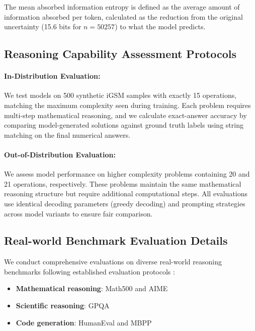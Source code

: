 \documentclass{article} %
\begin{document}
The mean absorbed information entropy is defined as the average amount of information absorbed per token, calculated as the reduction from the original uncertainty (15.6 bits for $n = 50257$) to what the model predicts.

\subsection{Reasoning Capability Assessment Protocols} \label{subsec:reasoning_eval}

\paragraph{In-Distribution Evaluation:}
We test models on 500 synthetic iGSM samples with exactly 15 operations, matching the maximum complexity seen during training. Each problem requires multi-step mathematical reasoning, and we calculate exact-answer accuracy by comparing model-generated solutions against ground truth labels using string matching on the final numerical answers.

\paragraph{Out-of-Distribution Evaluation:}
We assess model performance on higher complexity problems containing 20 and 21 operations, respectively. These problems maintain the same mathematical reasoning structure but require additional computational steps. All evaluations use identical decoding parameters (greedy decoding) and prompting strategies across model variants to ensure fair comparison.


\subsection{Real-world Benchmark Evaluation Details} \label{subsec:benchmark_eval}

We conduct comprehensive evaluations on diverse real-world reasoning benchmarks following established evaluation protocols \citep{lighteval}:

\begin{itemize}
    \item \textbf{Mathematical reasoning}: Math500 \citep{hendrycks2021measuring} and AIME \citep{aime}
    \item \textbf{Scientific reasoning}: GPQA \citep{rein2024gpqa}
    \item \textbf{Code generation}: HumanEval \citep{chen2021evaluating} and MBPP \citep{austin2021program}
\end{itemize}
\end{document}
